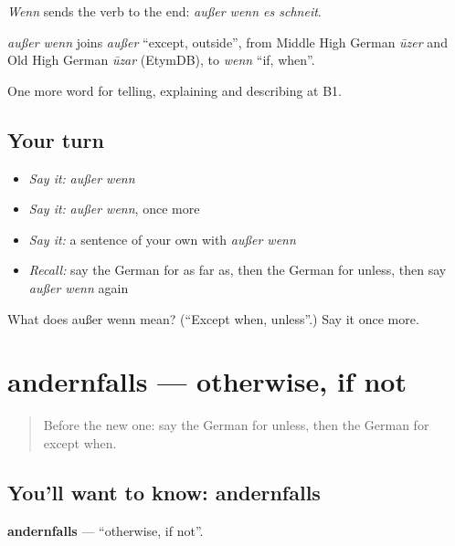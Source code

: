 \emph{Wenn} sends the verb to the end: \emph{außer wenn es schneit}.

\begin{cousinweb}
\emph{außer wenn} joins \emph{außer} \textquotedblleft{}except, outside\textquotedblright{}, from Middle High German \emph{ūzer} and Old High German \emph{ūzar} (EtymDB), to \emph{wenn} \textquotedblleft{}if, when\textquotedblright{}.
\end{cousinweb}

\begin{grammarlens}[title={What you've built}]
One more word for telling, explaining and describing at B1.
\end{grammarlens}

\subsection*{Your turn}
\begin{itemize}
\raggedright
  \item \emph{Say it:} \emph{außer wenn}
  \item \emph{Say it:} \emph{außer wenn}, once more
  \item \emph{Say it:} a sentence of your own with \emph{außer wenn}
  \item \emph{Recall:} say the German for as far as, then the German for unless, then say \emph{außer wenn} again
\end{itemize}

\begin{tcolorbox}[breakable,colback=teal!4,colframe=teal!35!black,title={Before you move on}]
What does außer wenn mean? (\textquotedblleft{}Except when, unless\textquotedblright{}.) Say it once more.
\end{tcolorbox}
\section[andernfalls]{andernfalls — otherwise, if not}

\label{lesson:GE-C365-andernfalls}



\begin{quote}
Before the new one: say the German for unless, then the German for except when.
\end{quote}

\subsection*{You'll want to know: andernfalls}
\textbf{andernfalls} — \textquotedblleft{}otherwise, if not\textquotedblright{}.

